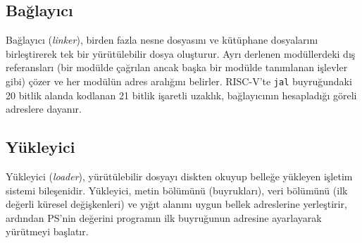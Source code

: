 \subsection{Bağlayıcı}
Bağlayıcı (\textit{linker}), birden fazla nesne dosyasını ve kütüphane dosyalarını birleştirerek tek bir yürütülebilir dosya oluşturur. Ayrı derlenen modüllerdeki dış referansları (bir modülde çağrılan ancak başka bir modülde tanımlanan işlevler gibi) çözer ve her modülün adres aralığını belirler. RISC-V'te \texttt{jal} buyruğundaki 20 bitlik alanda kodlanan 21 bitlik işaretli uzaklık, bağlayıcının hesapladığı göreli adreslere dayanır.

\subsection{Yükleyici}
Yükleyici (\textit{loader}), yürütülebilir dosyayı diskten okuyup belleğe yükleyen işletim sistemi bileşenidir. Yükleyici, metin bölümünü (buyrukları), veri bölümünü (ilk değerli küresel değişkenleri) ve yığıt alanını uygun bellek adreslerine yerleştirir, ardından PS'nin değerini programın ilk buyruğunun adresine ayarlayarak yürütmeyi başlatır.

